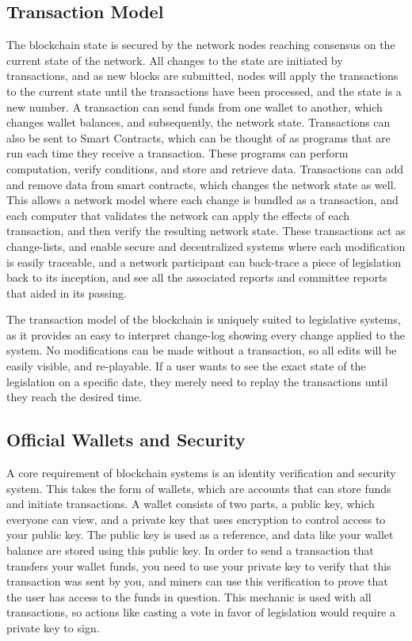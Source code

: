 \documentclass[letterpaper,twocolumn]{article}
\begin{document}
\subsection*{Transaction Model}
The blockchain state is secured by the network nodes reaching consensus on the current state of the network.  All changes to the state are initiated by transactions, and as new blocks are submitted, nodes will apply the transactions to the current state until the transactions have been processed, and the state is a new number.  A transaction can send funds from one wallet to another, which changes wallet balances, and subsequently, the network state.  Transactions can also be sent to Smart Contracts, which can be thought of as programs that are run each time they receive a transaction.  These programs can perform computation, verify conditions, and store and retrieve data. Transactions can add and remove data from smart contracts, which changes the network state as well.  This allows a network model where each change is bundled as a transaction, and each computer that validates the network can apply the effects of each transaction, and then verify the resulting network state.  These transactions act as change-lists, and enable secure and decentralized systems where each modification is easily traceable, and a network participant can back-trace a piece of legislation back to its inception, and see all the associated reports and committee reports that aided in its passing. 

The transaction model of the blockchain is uniquely suited to legislative systems, as it provides an easy to interpret change-log showing every change applied to the system.  No modifications can be made without a transaction, so all edits will be easily visible, and re-playable.  If a user wants to see the exact state of the legislation on a specific date, they merely need to replay the transactions until they reach the desired time.

\subsection*{Official Wallets and Security}
A core requirement of blockchain systems is an identity verification and security system.  This takes the form of wallets, which are accounts that can store funds and initiate transactions.  A wallet consists of two parts, a public key, which everyone can view, and a private key that uses encryption to control access to your public key.  The public key is used as a reference, and data like your wallet balance are stored using this public key.  In order to send a transaction that transfers your wallet funds, you need to use your private key to verify that this transaction was sent by you, and miners can use this verification to prove that the user has access to the funds in question.  This mechanic is used with all transactions, so actions like casting a vote in favor of legislation would require a private key to sign.  
\end{document}
